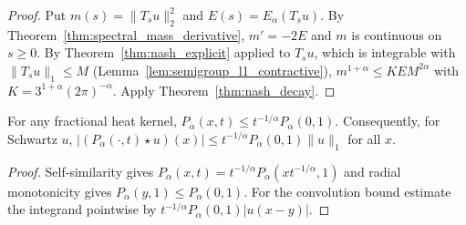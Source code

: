 \begin{proof}
\leanok
Put $m(s) = \lVert T_s u\rVert_2^2$ and $E(s) = E_\alpha(T_s u)$. By Theorem~\ref{thm:spectral_mass_derivative}, $m' = -2E$ and $m$ is continuous on $s \ge 0$. By Theorem~\ref{thm:nash_explicit} applied to $T_s u$, which is integrable with $\lVert T_s u\rVert_1 \le M$ (Lemma~\ref{lem:semigroup_l1_contractive}), $m^{1+\alpha} \le K E M^{2\alpha}$ with $K = 3^{1+\alpha}(2\pi)^{-\alpha}$. Apply Theorem~\ref{thm:nash_decay}.
\end{proof}

\begin{lemma}\label{lem:l1_linf}
\leanok
For any fractional heat kernel, $P_\alpha(x, t) \le t^{-1/\alpha} P_\alpha(0, 1)$. Consequently, for Schwartz $u$, $\lvert (P_\alpha(\cdot, t) \star u)(x)\rvert \le t^{-1/\alpha} P_\alpha(0, 1) \lVert u\rVert_1$ for all $x$.
\end{lemma}

\begin{proof}
\leanok
Self-similarity gives $P_\alpha(x, t) = t^{-1/\alpha} P_\alpha(x t^{-1/\alpha}, 1)$ and radial monotonicity gives $P_\alpha(y, 1) \le P_\alpha(0, 1)$. For the convolution bound estimate the integrand pointwise by $t^{-1/\alpha}P_\alpha(0, 1)\lvert u(x - y)\rvert$.
\end{proof}
